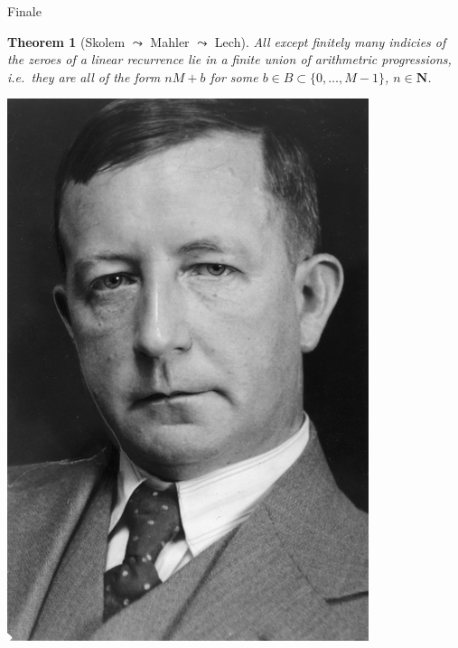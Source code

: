 \documentclass[notheorems]{beamer}
\theoremstyle{plain}
\newtheorem{theorem}{Theorem}[section]
\theoremstyle{definition}
\theoremstyle{definition}
\theoremstyle{definition}
\newcommand{\NN}{\mathbf{N}}
\begin{document}
\begin{frame}{Finale}
\begin{theorem}[{Skolem \(\leadsto\) Mahler \(\leadsto\) Lech}]
All except finitely many indicies of the zeroes of a linear recurrence lie in a finite union of arithmetric progressions, i.e.\ they are all of the form \(nM + b\) for some \(b \in B \subset \{0, \ldots, M-1\}\), \(n \in \NN\).%
\end{theorem}
\pause
\includegraphics[height = 0.6\textheight]{skolem.jpeg}
\end{frame}
\end{document}
